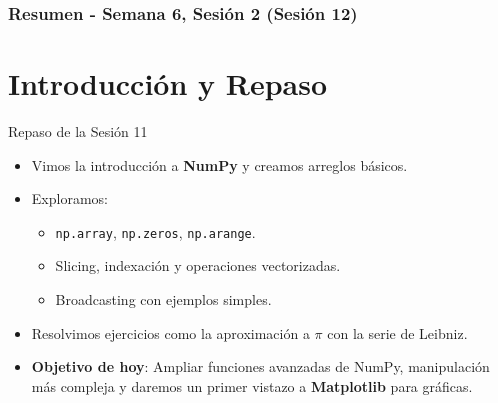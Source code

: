 \documentclass[10pt]{beamer}
\begin{document}
\myfront{}

\begin{frame}
  \titlepage
\end{frame}

\begin{frame}
  \frametitle{Resumen - Semana 6, Sesión 2 (Sesión 12)}
  \tableofcontents
\end{frame}


\section{Introducción y Repaso}

\begin{frame}{Repaso de la Sesión 11}
  \begin{itemize}
    \item Vimos la introducción a \textbf{NumPy} y creamos arreglos básicos.
    \item Exploramos:
      \begin{itemize}
        \item \texttt{np.array}, \texttt{np.zeros}, \texttt{np.arange}.
        \item Slicing, indexación y operaciones vectorizadas.
        \item Broadcasting con ejemplos simples.
      \end{itemize}
    \item Resolvimos ejercicios como la aproximación a \(\pi\) con la serie de Leibniz.
    \item \textbf{Objetivo de hoy}: Ampliar funciones avanzadas de NumPy, manipulación más compleja y daremos un primer vistazo a \textbf{Matplotlib} para gráficas.
  \end{itemize}
\end{frame}
\end{document}
